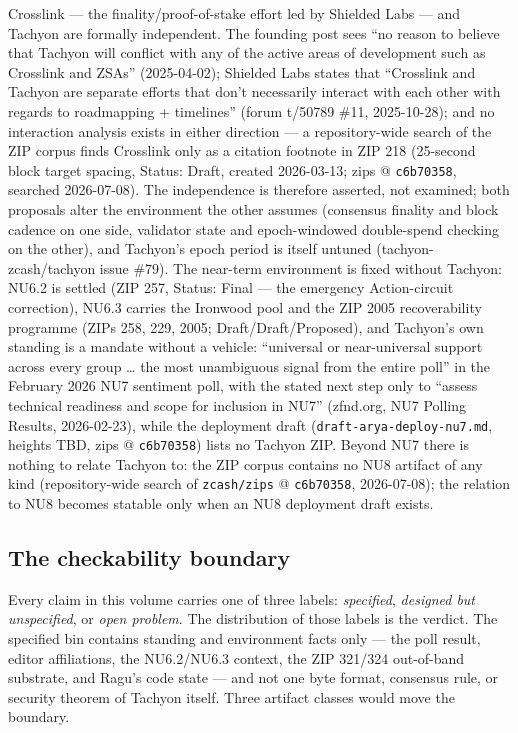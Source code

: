\documentclass[11pt,a4paper]{article}
\theoremstyle{definition}
\begin{document}
Crosslink --- the finality/proof-of-stake effort led by Shielded Labs ---
and Tachyon are formally independent. The founding post sees ``no reason to
believe that Tachyon will conflict with any of the active areas of
development such as Crosslink and ZSAs'' (2025-04-02);
Shielded Labs states that ``Crosslink and Tachyon are separate efforts that
don't necessarily interact with each other with regards to roadmapping +
timelines'' (forum t/50789 \#11, 2025-10-28); and no interaction analysis
exists in either direction --- a repository-wide search of the ZIP corpus
finds Crosslink only as a citation footnote in ZIP 218 (25-second block
target spacing, Status: Draft, created 2026-03-13; zips @
\texttt{c6b70358}, searched 2026-07-08). The independence is therefore
asserted, not examined; both proposals alter the environment the other
assumes (consensus finality and block cadence on one side, validator state
and epoch-windowed double-spend checking on the other), and Tachyon's epoch
period is itself untuned (tachyon-zcash/tachyon issue \#79). The near-term
environment is fixed without Tachyon: NU6.2 is settled (ZIP 257, Status:
Final --- the emergency Action-circuit correction), NU6.3 carries the
Ironwood pool and the ZIP 2005 recoverability programme (ZIPs 258, 229,
2005; Draft/Draft/Proposed), and Tachyon's own standing is a mandate
without a vehicle: ``universal or near-universal support across every group
\ldots{} the most unambiguous signal from the entire poll'' in the February
2026 NU7 sentiment poll, with the stated next step only to ``assess
technical readiness and scope for inclusion in NU7'' (zfnd.org, NU7 Polling
Results, 2026-02-23), while the deployment draft
(\texttt{draft-arya-deploy-nu7.md}, heights TBD, zips @ \texttt{c6b70358})
lists no Tachyon ZIP. Beyond NU7 there is nothing to relate Tachyon to: the
ZIP corpus contains no NU8 artifact of any kind (repository-wide search of
\texttt{zcash/zips} @ \texttt{c6b70358}, 2026-07-08); the relation to NU8
becomes statable only when an NU8 deployment draft exists.

\subsection{The checkability boundary}\label{sec:tachyon-checkability}

Every claim in this volume carries one of three labels: \emph{specified},
\emph{designed but unspecified}, or \emph{open problem}. The distribution
of those labels is the verdict. The specified bin contains standing and
environment facts only --- the poll result, editor affiliations, the
NU6.2/NU6.3 context, the ZIP 321/324 out-of-band substrate, and Ragu's code
state --- and not one byte format, consensus rule, or security theorem of
Tachyon itself. Three artifact classes would move the boundary.
\end{document}

